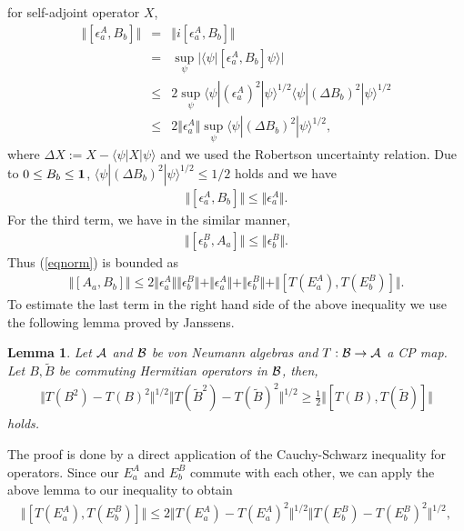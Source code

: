 \documentclass[12pt,showpacs,preprintnumbers,amsmath,amssymb]{revtex4-2}
\newtheorem{lemma}{Lemma}
\begin{document}
for self-adjoint operator $X$, 
\begin{eqnarray*}
\Vert [\epsilon^A_a, B_b]\Vert &=&
\Vert i[\epsilon^A_a, B_b]\Vert \\
&=&\sup_{\psi}|\langle \psi|
[\epsilon^A_a, B_b]\psi\rangle|
\\
&\leq& 
2 \sup_{\psi} \langle \psi|(\epsilon^A_a)^2 |\psi \rangle^{1/2}
\langle \psi|(\Delta B_b)^2 |\psi\rangle^{1/2}
\\
&\leq&
 2 \Vert \epsilon^A_a\Vert \sup_{\psi}\langle 
\psi|(\Delta B_b)^2|\psi\rangle^{1/2},
\end{eqnarray*}
where $\Delta X:=X-\langle \psi|X|\psi \rangle$ and we used the 
Robertson uncertainty relation. 
Due to $0\leq B_b \leq {\bf 1}$, 
$\langle \psi|(\Delta B_b)^2 |\psi\rangle^{1/2}\leq 1/2$ holds and
we have
\begin{eqnarray*}
\Vert [\epsilon^A_a, B_b]\Vert\leq \Vert \epsilon^A_a\Vert. 
\end{eqnarray*} 
For the third term, we have in the similar manner, 
\begin{eqnarray*}
\Vert [\epsilon^B_b, A_a]\Vert \leq \Vert \epsilon^B_b\Vert.
\end{eqnarray*}
Thus (\ref{eqnorm}) is bounded as
\begin{eqnarray}
\Vert [A_a,B_b]\Vert
\leq 2\Vert \epsilon^A_a \Vert \Vert \epsilon^B_b \Vert 
+\Vert \epsilon^A_a \Vert +\Vert \epsilon^B_b \Vert 
+\Vert [T(E^A_a), T(E^B_b)]\Vert. 
\label{mouchoi}
\end{eqnarray}
To estimate the last term in the right hand side of the above 
inequality we use the following lemma proved by Janssens\cite{Janssens}.
\begin{lemma}
Let ${\cal A}$ and ${\cal B}$ be von Neumann algebras and 
$T: {\cal B} \to {\cal A}$ a CP map. 
Let $B, \tilde{B}$ be commuting Hermitian operators in ${\cal B}$, 
then, 
\begin{eqnarray*}
\Vert T(B^2)-T(B)^2\Vert^{1/2}
\Vert T(\tilde{B}^2)-T(\tilde{B})^2\Vert^{1/2}
\geq \frac{1}{2}\Vert [T(B),T(\tilde{B})]\Vert
\end{eqnarray*}
holds. 
\end{lemma}
The proof is done by a direct application of the 
Cauchy-Schwarz inequality for operators. 
Since our $E^A_a$ and $E^B_b$ commute with each other, 
we can apply the above lemma to our inequality to obtain
\begin{eqnarray}
\Vert [T(E^A_a),T(E^B_b)]\Vert 
\leq 2 \Vert T(E^A_a)-T(E^A_a)^2\Vert^{1/2} 
\Vert T(E^B_b)-T(E^B_b)^2\Vert^{1/2},
\label{Tcommutator}
\end{eqnarray}
\end{document}
